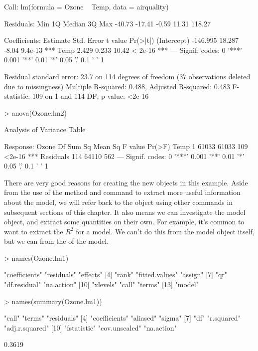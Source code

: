 \begin{Schunk}
\begin{Soutput}
Call:
lm(formula = Ozone ~ Temp, data = airquality)

Residuals:
   Min     1Q Median     3Q    Max 
-40.73 -17.41  -0.59  11.31 118.27 

Coefficients:
            Estimate Std. Error t value Pr(>|t|)    
(Intercept) -146.995     18.287   -8.04  9.4e-13 ***
Temp           2.429      0.233   10.42  < 2e-16 ***
---
Signif. codes:  
0 '***' 0.001 '**' 0.01 '*' 0.05 '.' 0.1 ' ' 1

Residual standard error: 23.7 on 114 degrees of freedom
  (37 observations deleted due to missingness)
Multiple R-squared:  0.488,	Adjusted R-squared:  0.483 
F-statistic:  109 on 1 and 114 DF,  p-value: <2e-16
\end{Soutput}
\begin{Sinput}
> anova(Ozone.lm2) 
\end{Sinput}
\begin{Soutput}
Analysis of Variance Table

Response: Ozone
           Df Sum Sq Mean Sq F value Pr(>F)    
Temp        1  61033   61033     109 <2e-16 ***
Residuals 114  64110     562                   
---
Signif. codes:  
0 '***' 0.001 '**' 0.01 '*' 0.05 '.' 0.1 ' ' 1
\end{Soutput}
\end{Schunk}
There are very good reasons for creating the new objects in this example. Aside from the use of the  method and  command to extract more useful information about the model, we will refer back to the object using other commands in subsequent sections of this chapter. It also means we can investigate the model object, and extract some quantities on their own. For example, it's common to want to extract the $R^2$ for a model. We can't do this from the model object itself, but we can from the  of the model. 
\begin{Schunk}
\begin{Sinput}
> names(Ozone.lm1) 
\end{Sinput}
\begin{Soutput}
 [1] "coefficients"  "residuals"     "effects"      
 [4] "rank"          "fitted.values" "assign"       
 [7] "qr"            "df.residual"   "na.action"    
[10] "xlevels"       "call"          "terms"        
[13] "model"        
\end{Soutput}
\begin{Sinput}
> names(summary(Ozone.lm1)) 
\end{Sinput}
\begin{Soutput}
 [1] "call"          "terms"         "residuals"    
 [4] "coefficients"  "aliased"       "sigma"        
 [7] "df"            "r.squared"     "adj.r.squared"
[10] "fstatistic"    "cov.unscaled"  "na.action"    
\end{Soutput}
\begin{Soutput}
[1] 0.3619
\end{Soutput}
\end{Schunk}
 
